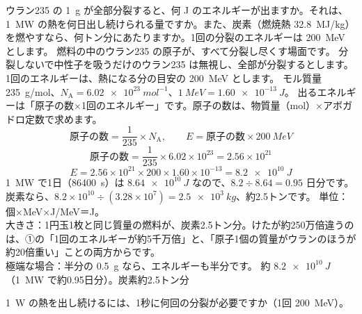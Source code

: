 \label{ph:原-15:ex1}
\begin{phreidai}
ウラン235 の \qty{1}{g} が全部分裂すると、何 J のエネルギーが出ますか。それは、\qty{1}{MW} の熱を何日出し続けられる量ですか。また、炭素（燃焼熱 \qty{32.8}{MJ/kg}）を燃やすなら、何トン分にあたりますか。1回の分裂のエネルギーは \qty{200}{MeV} とします。
\phbamen
燃料の中のウラン235 の原子が、すべて分裂し尽くす場面です。
\phmushi
分裂しないで中性子を吸うだけのウラン235 は無視し、全部が分裂するとします。1回のエネルギーは、熱になる分の目安の \qty{200}{MeV} とします。
\phzu
モル質量 \qty{235}{g/mol}、$N_{\mathrm A}=\qty{6.02e23}{mol^{-1}}$、$\qty{1}{MeV}=\qty{1.60e-13}{J}$。
\phriyu
出るエネルギーは「原子の数×1回のエネルギー」です。原子の数は、物質量（mol）×アボガドロ定数で求めます。
\phtateru
\[ \text{原子の数}=\frac{1}{235}\times N_{\mathrm A},\qquad E=\text{原子の数}\times\qty{200}{MeV} \]
\phtoku
\[ \text{原子の数}=\frac{1}{235}\times6.02\times10^{23}=2.56\times10^{21} \]
\[ E=2.56\times10^{21}\times200\times1.60\times10^{-13}=\qty{8.2e10}{J} \]
\qty{1}{MW} で1日（\qty{86400}{s}）は $\qty{8.64e10}{J}$ なので、$8.2\div8.64=0.95$ 日分です。炭素なら、$8.2\times10^{10}\div(3.28\times10^7)=\qty{2.5e3}{kg}$、約2.5トンです。
\phtashikame
単位：個×MeV×J/MeV＝J。\\
大きさ：1円玉1枚と同じ質量の燃料が、炭素2.5トン分。けたが約250万倍違うのは、①の「1回のエネルギーが約5千万倍」と、「原子1個の質量がウランのほうが約20倍重い」ことの両方からです。\\
極端な場合：半分の \qty{0.5}{g} なら、エネルギーも半分です。
\kotae 約 $\qty{8.2e10}{J}$（\qty{1}{MW} で約0.95日分）。炭素約2.5トン分
\end{phreidai}
\begin{jibun}
\qty{1}{W} の熱を出し続けるには、1秒に何回の分裂が必要ですか（1回 \qty{200}{MeV}）。
\end{jibun}

